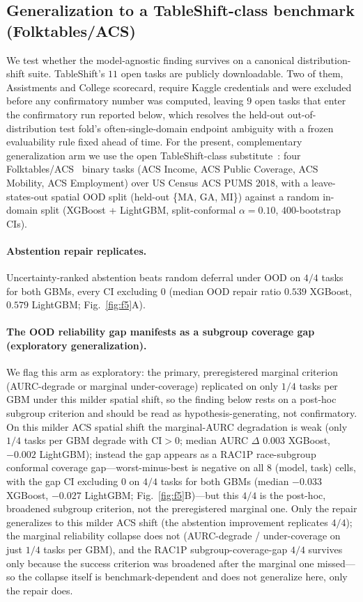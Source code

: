 \documentclass[pdflatex,sn-mathphys-num]{sn-jnl}
\begin{document}
\subsection*{Generalization to a TableShift-class benchmark (Folktables/ACS)}
We test whether the model-agnostic finding survives on a canonical distribution-shift suite. TableShift's $11$ open tasks are publicly downloadable. Two of them, Assistments and
College scorecard, require Kaggle credentials and were excluded before any
confirmatory number was computed, leaving $9$ open tasks that enter the confirmatory run reported below, which
resolves the held-out out-of-distribution test fold's often-single-domain endpoint ambiguity with a frozen
evaluability rule fixed ahead of time. For the present, complementary generalization arm we use the open
TableShift-class substitute~\citep{gardner2023tableshift}: four
Folktables/ACS~\citep{ding2021retiring} binary tasks (ACS Income, ACS Public Coverage,
ACS Mobility, ACS Employment) over US Census ACS PUMS 2018, with a leave-states-out
spatial OOD split (held-out \{MA, GA, MI\}) against a random in-domain split
(XGBoost + LightGBM, split-conformal $\alpha=0.10$, $400$-bootstrap CIs). \paragraph{Abstention repair
replicates.} Uncertainty-ranked abstention beats random deferral under OOD on $4/4$ tasks for both
GBMs, every CI excluding $0$ (median OOD repair ratio $0.539$ XGBoost, $0.579$ LightGBM;
Fig.~\ref{fig:f5}A). \paragraph{The OOD reliability gap manifests as a subgroup coverage gap (exploratory
generalization).} We flag this arm as exploratory: the primary, preregistered marginal criterion
(AURC-degrade or marginal under-coverage) replicated on only $1/4$ tasks per GBM under this milder spatial
shift, so the finding below rests on a post-hoc subgroup criterion and should be read as hypothesis-generating,
not confirmatory. On this milder
ACS spatial shift the marginal-AURC degradation is weak (only $1/4$ tasks per GBM degrade with CI$>0$;
median AURC $\Delta$ $0.003$ XGBoost, $-0.002$ LightGBM); instead the gap appears as a RAC1P
race-subgroup conformal coverage gap---worst-minus-best is negative on all $8$ (model, task) cells, with
the gap CI excluding $0$ on $4/4$ tasks for both GBMs (median $-0.033$ XGBoost, $-0.027$ LightGBM;
Fig.~\ref{fig:f5}B)---but this $4/4$ is the post-hoc, broadened subgroup criterion, not the
preregistered marginal one. Only the repair generalizes to this milder
ACS shift (the abstention improvement replicates $4/4$); the marginal reliability collapse does
not (AURC-degrade / under-coverage on just $1/4$ tasks per GBM), and the RAC1P subgroup-coverage-gap
$4/4$ survives only because the success criterion was broadened after the marginal one missed---so the
collapse itself is benchmark-dependent and does not generalize here, only the repair does.
\end{document}
